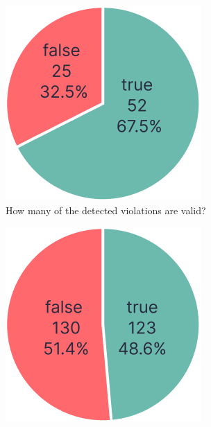 \documentclass{master_thesis}
\begin{document}
\begin{figure}[ht]
	\centering
	\begin{subfigure}{0.3\textwidth}
	\includegraphics[width=\textwidth]{img/violations.png}
	\caption{How many of the detected violations are valid?}
	\label{fig:checks-validity-failed}
	\end{subfigure}
	\hspace{0.03\textwidth}
	\begin{subfigure}{0.3\textwidth}
	\includegraphics[width=\textwidth]{img/passes.png}

\end{subfigure}
\end{figure}
\end{document}
